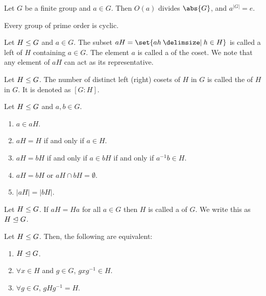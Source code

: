 \documentclass[11pt]{penrose}
\begin{document}
\begin{ncor}
    Let $G$ be a finite group and $a \in G$. Then $O(a)$ divides $\abs{G}$, and $a^{|G|} = e$.
\end{ncor}

\begin{ncor}
    Every group of prime order is cyclic.
\end{ncor}

\begin{ndfn}[Cosets]
    Let $H \mathrel{\leq} G$ and $a \in G$. The subset $aH = \set{ah \st h \in H}$ is called a left  of $H$ containing $a \in G$. The element $a$ is called a  of the coset. We note that any element of $aH$ can act as its representative.
\end{ndfn}

\begin{ndfn}[Index]
    Let $H \mathrel{\leq} G$. The number of distinct left (right) cosets of $H$ in $G$ is called the  of $H$ in $G$. It is denoted as $[G:H]$.
\end{ndfn}

\begin{nthm}
    Let $H \mathrel{\leq} G$ and $a, b \in G$.
    \begin{enumerate}
        \item $a \in aH$.
        \item $aH = H$ if and only if $a \in H$.
        \item $aH = bH$ if and only if $a \in bH$ if and only if $a^{-1} b \in H$.
        \item $aH = bH$ or $aH \cap bH = \emptyset$.
        \item $|aH| = |bH|$.
    \end{enumerate}
\end{nthm}

\begin{ndfn}
    Let $H \mathrel{\leq} G$. If $aH = Ha$ for all $a \in G$ then $H$ is called a  of $G$. We write this as $H \mathrel{\trianglelefteq} G$.
\end{ndfn}

\begin{nthm}
    Let $H \mathrel{\leq} G$. Then, the following are equivalent:
    \begin{enumerate}
        \item $H \mathrel{\trianglelefteq} G$.
        \item $\forall x \in H$ and $g \in G$, $g x g^{-1} \in H$.
        \item $\forall g \in G$, $g H g^{-1} = H$.
    \end{enumerate}
\end{nthm}
\end{document}
